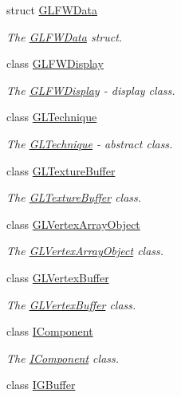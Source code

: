 \begin{DoxyCompactItemize}
struct \hyperlink{structEngine_1_1GLFWData}{G\+L\+F\+W\+Data}
\begin{DoxyCompactList}\small\item\em The \hyperlink{structEngine_1_1GLFWData}{G\+L\+F\+W\+Data} struct. \end{DoxyCompactList}\item 
class \hyperlink{classEngine_1_1GLFWDisplay}{G\+L\+F\+W\+Display}
\begin{DoxyCompactList}\small\item\em The \hyperlink{classEngine_1_1GLFWDisplay}{G\+L\+F\+W\+Display} -\/ display class. \end{DoxyCompactList}\item 
class \hyperlink{classEngine_1_1GLTechnique}{G\+L\+Technique}
\begin{DoxyCompactList}\small\item\em The \hyperlink{classEngine_1_1GLTechnique}{G\+L\+Technique} -\/ abstract class. \end{DoxyCompactList}\item 
class \hyperlink{classEngine_1_1GLTextureBuffer}{G\+L\+Texture\+Buffer}
\begin{DoxyCompactList}\small\item\em The \hyperlink{classEngine_1_1GLTextureBuffer}{G\+L\+Texture\+Buffer} class. \end{DoxyCompactList}\item 
class \hyperlink{classEngine_1_1GLVertexArrayObject}{G\+L\+Vertex\+Array\+Object}
\begin{DoxyCompactList}\small\item\em The \hyperlink{classEngine_1_1GLVertexArrayObject}{G\+L\+Vertex\+Array\+Object} class. \end{DoxyCompactList}\item 
class \hyperlink{classEngine_1_1GLVertexBuffer}{G\+L\+Vertex\+Buffer}
\begin{DoxyCompactList}\small\item\em The \hyperlink{classEngine_1_1GLVertexBuffer}{G\+L\+Vertex\+Buffer} class. \end{DoxyCompactList}\item 
class \hyperlink{classEngine_1_1IComponent}{I\+Component}
\begin{DoxyCompactList}\small\item\em The \hyperlink{classEngine_1_1IComponent}{I\+Component} class. \end{DoxyCompactList}\item 
class \hyperlink{classEngine_1_1IGBuffer}{I\+G\+Buffer}

\end{DoxyCompactItemize}
